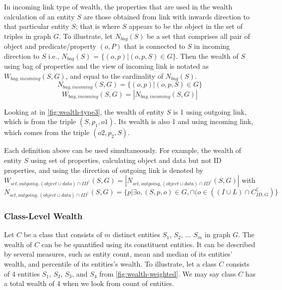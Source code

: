 In incoming link type of wealth, the properties that are used in the wealth calculation of an entity \(S\) are those obtained from link with inwards direction to that particular entity \(S\); that is where \(S\) appears to be the object in the set of triples in graph \(G\). To illustrate, let \(N_{bag}(S)\) be a set that comprises all pair of object and predicate/property \((o,P)\) that is connected to \(S\) in incoming direction to \(S\) i.e., \(N_{bag}(S)\) = \(\{(o, p) | (o, p, S) \in G\}\). Then the wealth of \(S\) using bag of properties and the view of incoming link is notated as \(W_{bag, incoming}(S, G)\), and equal to the cardinality of \(N_{bag}(S)\).
\[
    N_{bag, incoming}(S, G) = \{(o,p) | (o, p, S) \in G\}
\]
\[
    W_{bag, incoming}(S, G) = |N_{bag, incoming}(S, G)|
\]

Looking at in \autoref{fig:wealth-type3}, the wealth of entity \(S\) is 1 using outgoing link, which is from the triple \((S, p_1, o1)\). Its wealth is also 1 and using incoming link, which comes from the triple \((o2, p_2, S)\).

Each definition above can be used simultaneously. For example, the wealth of entity \(S\) using set of properties, calculating object and data but not ID properties, and using the direction of outgoing link is denoted by \(W_{set, outgoing, (object \cup data) \cap ID^\complement}(S, G) = |N_{set, outgoing, (object \cup data) \cap ID^\complement}(S, G)|\) with \(N_{set, outgoing, (object \cup data) \cap ID^\complement}(S, G) = \{p | \exists o, (S, p, o) \in G, \cap (o \in ((I \cup L) \cap C_{ID,G}^\complement)\}\)

\subsubsection{Class-Level Wealth}
Let \(C\) be a class that consists of \(m\) distinct entities \(S_1\), \(S_2\), ... \(S_m\) in graph \(G\). The wealth of \(C\) can be be quantified using its constituent entities. It can be described by several measures, such as entity count, mean and median of its entities' wealth, and percentile of its entities's wealth. To illustrate, let a class \(C\) consists of 4 entities  \(S_1\), \(S_2\), \(S_3\), and \(S_4\) from \autoref{fig:wealth-weighted}. We may say class \(C\) has a total wealth of 4 when we look from count of entities.